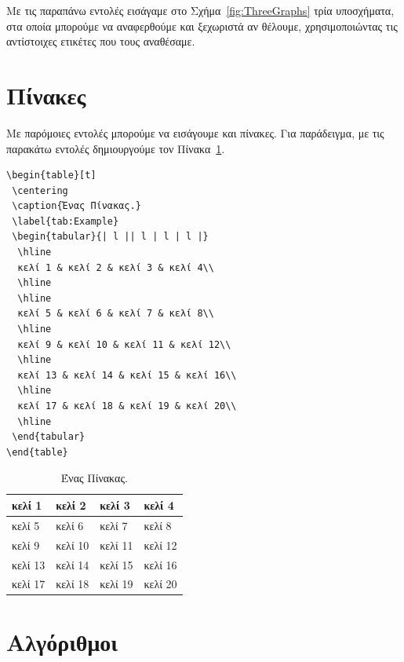 Με τις παραπάνω εντολές εισάγαμε στο Σχήμα~\ref{fig:ThreeGraphs} τρία υποσχήματα, στα οποία μπορούμε να αναφερθούμε και ξεχωριστά αν θέλουμε, χρησιμοποιώντας τις αντίστοιχες ετικέτες που τους αναθέσαμε.


\section{Πίνακες}
\label{sec:Tables}

Με παρόμοιες εντολές μπορούμε να εισάγουμε και πίνακες.
Για παράδειγμα, με τις παρακάτω εντολές δημιουργούμε τον Πίνακα~\ref{tab:Example}.

\begin{verbatim}
\begin{table}[t]
 \centering
 \caption{Ένας Πίνακας.}
 \label{tab:Example}
 \begin{tabular}{| l || l | l | l |}
  \hline
  κελί 1 & κελί 2 & κελί 3 & κελί 4\\
  \hline
  \hline
  κελί 5 & κελί 6 & κελί 7 & κελί 8\\
  \hline
  κελί 9 & κελί 10 & κελί 11 & κελί 12\\
  \hline
  κελί 13 & κελί 14 & κελί 15 & κελί 16\\
  \hline
  κελί 17 & κελί 18 & κελί 19 & κελί 20\\
  \hline
 \end{tabular}
\end{table}
\end{verbatim}

\begin{table}[t]
	\centering
	\caption{Ένας Πίνακας.}
	\label{tab:Example}
	\begin{tabular}{| l || l | l | l |}
		\hline
		κελί 1 & κελί 2 & κελί 3 & κελί 4\\
		\hline
		\hline
		κελί 5 & κελί 6 & κελί 7 & κελί 8\\
		\hline
		κελί 9 & κελί 10 & κελί 11 & κελί 12\\
		\hline
		κελί 13 & κελί 14 & κελί 15 & κελί 16\\
		\hline
		κελί 17 & κελί 18 & κελί 19 & κελί 20\\
		\hline
	\end{tabular}
\end{table}


\section{Αλγόριθμοι}
\label{sec:Algorithms}

